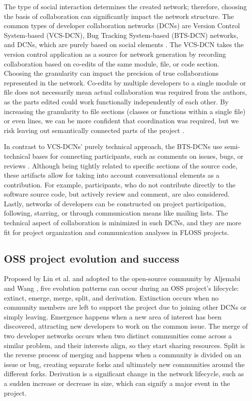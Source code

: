 The type of social interaction determines the created network; therefore, choosing the basis of collaboration can significantly impact the network structure. The common types of developer collaboration networks (DCNs) are Version Control System-based (VCS-DCN), Bug Tracking System-based (BTS-DCN) networks, and DCNs, which are purely based on social elements \cite{aljemabiEmpiricalStudyEvolution2018}. The VCS-DCN takes the version control application as a source for network generation by recording collaboration based on co-edits of the same module, file, or code section. Choosing the granularity can impact the precision of true collaborations represented in the network. Co-edits by multiple developers to a single module or file does not necessarily mean actual collaboration was required from the authors, as the parts edited could work functionally independently of each other. By increasing the granularity to file sections (classes or functions within a single file) or even lines, we can be more confident that coordination was required, but we risk leaving out semantically connected parts of the project \cite{joblinEvolutionaryTrendsDeveloper2017}.

In contrast to VCS-DCNs' purely technical approach, the BTS-DCNs use semi-technical bases for connecting participants, such as comments on issues, bugs, or reviews \cite{elasriPeripheryCoreTemporal2017}. Although being tightly related to specific sections of the source code, these artifacts allow for taking into account conversational elements as a contribution. For example, participants, who do not contribute directly to the software source code, but actively review and comment, are also considered. Lastly, networks of developers can be constructed on project participation, following, starring, or through communication means like mailing lists. The technical aspect of collaboration is minimized in such DCNs, and they are more fit for project organization and communication analyses in FLOSS projects.

\subsection{OSS project evolution and success}
Proposed by Lin et al. \cite{linBlogCommunityDiscovery2007} and adopted to the open-source community by Aljemabi and Wang \cite{aljemabiEmpiricalStudyEvolution2018}, five evolution patterns can occur during an OSS project's lifecycle: extinct, emerge, merge, split, and derivation. Extinction occurs when no community members are left to support the project due to joining other DCNs or simply leaving. Emergence happens when a new area of interest has been discovered, attracting new developers to work on the common issue. The merge of two developer networks occurs when two distinct communities come across a similar problem, and their interests align, so they start sharing resources. Split is the reverse process of merging and happens when a community is divided on an issue or bug, creating separate forks and ultimately new communities around the different forks. Derivation is a significant change in the network lifecycle, such as a sudden increase or decrease in size, which can signify a major event in the project.

